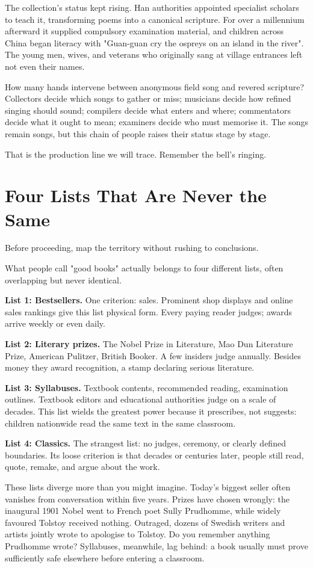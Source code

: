 The collection's status kept rising. Han authorities appointed specialist scholars to teach it, transforming poems into a canonical scripture. For over a millennium afterward it supplied compulsory examination material, and children across China began literacy with "Guan-guan cry the ospreys on an island in the river". The young men, wives, and veterans who originally sang at village entrances left not even their names.

How many hands intervene between anonymous field song and revered scripture? Collectors decide which songs to gather or miss; musicians decide how refined singing should sound; compilers decide what enters and where; commentators decide what it ought to mean; examiners decide who must memorise it. The songs remain songs, but this chain of people raises their status stage by stage.

That is the production line we will trace. Remember the bell's ringing.

\section{Four Lists That Are Never the Same}
Before proceeding, map the territory without rushing to conclusions.

What people call "good books" actually belongs to four different lists, often overlapping but never identical.

\textbf{List 1: Bestsellers.} One criterion: sales. Prominent shop displays and online sales rankings give this list physical form. Every paying reader judges; awards arrive weekly or even daily.

\textbf{List 2: Literary prizes.} The Nobel Prize in Literature, Mao Dun Literature Prize, American Pulitzer, British Booker. A few insiders judge annually. Besides money they award recognition, a stamp declaring serious literature.

\textbf{List 3: Syllabuses.} Textbook contents, recommended reading, examination outlines. Textbook editors and educational authorities judge on a scale of decades. This list wields the greatest power because it prescribes, not suggests: children nationwide read the same text in the same classroom.

\textbf{List 4: Classics.} The strangest list: no judges, ceremony, or clearly defined boundaries. Its loose criterion is that decades or centuries later, people still read, quote, remake, and argue about the work.

These lists diverge more than you might imagine. Today's biggest seller often vanishes from conversation within five years. Prizes have chosen wrongly: the inaugural 1901 Nobel went to French poet Sully Prudhomme, while widely favoured Tolstoy received nothing. Outraged, dozens of Swedish writers and artists jointly wrote to apologise to Tolstoy. Do you remember anything Prudhomme wrote? Syllabuses, meanwhile, lag behind: a book usually must prove sufficiently safe elsewhere before entering a classroom.

